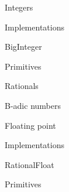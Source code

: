 \documentclass[12pt]{PalisadesLakesBook}
\begin{document}
\begin{plSection}{Integers}
\begin{plSection}{Implementations}
\begin{plSection}{\javaFont BigInteger}

\end{plSection}%
\begin{plSection}{Primitives}

\end{plSection}%
\end{plSection}%
\end{plSection}%
\begin{plSection}{Rationals}

\begin{plSection}{B-adic numbers}


\end{plSection}%
\begin{plSection}{Floating point}


\end{plSection}%
\begin{plSection}{Implementations}
\begin{plSection}{\javaFont RationalFloat}

\end{plSection}%
\begin{plSection}{Primitives}

\end{plSection}%
\end{plSection}%
\end{plSection}%
\end{document}
